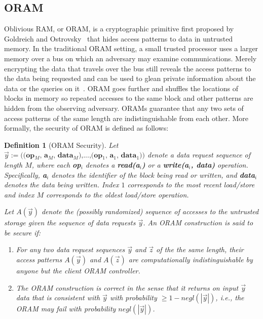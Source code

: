 \documentclass[letterpaper,twocolumn,10pt]{article}
\newtheorem{definition}[theorem]{Definition}
\begin{document}
\subsection{ORAM}
Oblivious RAM, or ORAM, is a cryptographic primitive first proposed by Goldreich and Ostrovsky~\cite{GO96} that hides access patterns to data in untrusted memory. In the traditional ORAM setting, a small trusted processor uses a larger memory over a bus on which an adversary may examine communications. Merely encrypting the data that travels over the bus still reveals the access patterns to the data being requested and can be used to glean private information about the data or the queries on it~\cite{IKK12}. ORAM goes further and shuffles the locations of blocks in memory so repeated accesses to the same block and other patterns are hidden from the observing adversary. ORAMs guarantee that any two sets of access patterns of the same length are indistinguishable from each other. More formally, the security of ORAM is defined as follows:
\begin{definition}[ORAM Security\cite{SDS+13}]
Let $\overrightarrow{y}:=\textbf{((op$_M$, a$_M$, data$_M$),...,(op$_1$, a$_1$, data$_1$))}$ denote a data request sequence of length $M$, where each \textbf{op$_i$} denotes a \textbf{read(a$_i$)} or a \textbf{write(a$_i$, data)} operation. Specifically, \textbf{a$_i$} denotes the identifier of the block being read or written, and \textbf{data$_i$} denotes the data being written. Index $1$ corresponds to the most recent load/store and index $M$ corresponds to the oldest load/store operation. 

Let $A(\overrightarrow{y})$ denote the (possibly randomized) sequence of accesses to the untrusted storage given the sequence of data requests $\overrightarrow{y}$. An ORAM construction is said to be secure if:
\begin{enumerate}
\setlength\itemsep{0pt}
\item For any two data request sequences $\overrightarrow{y}$ and $\overrightarrow{z}$ of the the same length, their access patterns $A(\overrightarrow{y})$ and $A(\overrightarrow{z})$ are computationally indistinguishable by anyone but the client ORAM controller.

\item The ORAM construction is correct in the sense that it returns on input $\overrightarrow{y}$ data that is consistent with $\overrightarrow{y}$ with probability $\geq 1 - \textit{negl}(|\overrightarrow{y}|)$, i.e., the ORAM may fail with probability $\textit{negl}(|\overrightarrow{y}|)$.
\end{enumerate}
\end{definition}
\end{document}
